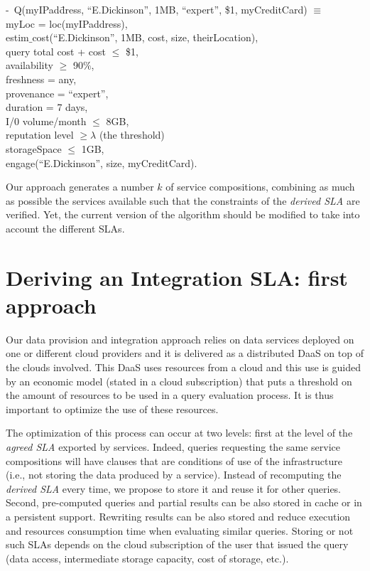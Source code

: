 \begin{footnotesize}
\sf
\begin{tabbing}
 -~Q(myIPad\=dress, ``E.Dickinson'', 1MB, ``expert'', \$1, myCreditCard) $\equiv$ \\
 \>  myLoc = loc(myIPaddress), \\
 \>  estim$\_$cost(``E.Dickinson'', 1MB, cost, size, theirLocation), \\
 \>  query total cost + cost $\leq$ \$1,\\
 \>  availability $\geq$ 90$\%$, \\
 \>  freshness = any, \\
 \>  provenance = ``expert'', \\
 \>  duration = 7 days, \\
 \>  I/0 volume/month $\leq$ 8GB, \\
 \>  reputation level $\geq \lambda$ (the threshold) \\
 \>  storageSpace $\leq$ 1GB, \\
 \>  engage(``E.Dickinson'', size, myCreditCard).
 \end{tabbing} 
\end{footnotesize}

Our approach  generates a number $k$ of service compositions, combining as much as possible the services available such that the constraints of the {\em derived SLA} are verified. 
 Yet, the current version of the algorithm should be modified to take into account the different SLAs. 
 
\section{Deriving an Integration SLA: first approach}
\label{sec:queryProcessOpt}
 Our data provision and integration approach relies on data services deployed on one or different cloud providers and it is delivered as a distributed DaaS on top of the clouds involved.  This DaaS  uses resources from a cloud and this use  is  guided by an economic model (stated in a cloud subscription) that puts a threshold on the amount of resources to be used in a query evaluation process. It is thus important to optimize the use of these resources. 
   
The optimization of this process can occur at two levels: first at the level of the {\em agreed SLA} exported by services.  Indeed, queries requesting the same service compositions will have clauses that are  conditions of use of the infrastructure (i.e., not storing the data produced by a service). Instead of recomputing the {\em derived SLA} every time, we propose to store it and reuse it for other queries. 
Second, pre-computed queries and partial results can be also stored in cache or in a persistent support. Rewriting results can be also stored and reduce execution and resources consumption time when evaluating similar queries. Storing or not such SLAs  depends on the cloud subscription of the user that issued the query (data access, intermediate storage capacity, cost of storage, etc.).


